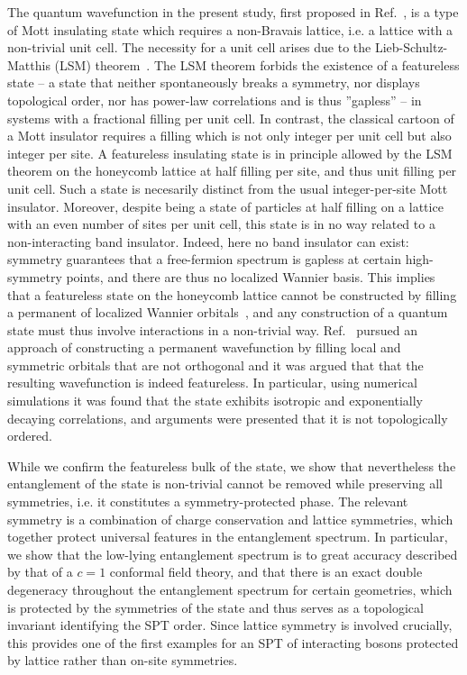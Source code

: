 The quantum wavefunction in the present study, first proposed in Ref.~,
is a type of Mott insulating state which requires a non-Bravais lattice, i.e. a lattice with a non-trivial unit cell. 
The necessity for a unit cell arises due to the Lieb-Schultz-Matthis (LSM) theorem~\cite{...}.
The LSM theorem forbids the existence of a featureless state
-- a state that neither spontaneously breaks a symmetry, nor displays topological
order, nor has power-law correlations and is thus ''gapless'' -- in systems
with a fractional filling per unit cell. In contrast, the classical cartoon of a Mott insulator requires a filling which is not only integer per unit cell but also integer per site. A featureless insulating state is in principle allowed by the LSM theorem on the honeycomb lattice
at half filling per site, and thus unit filling per unit cell. Such a state is necesarily distinct from the usual integer-per-site Mott insulator. 
Moreover, despite being a state of particles at half filling on a lattice with an even number of sites per unit cell, this state is in no way related to a non-interacting band insulator.  Indeed, here no band insulator can exist: symmetry guarantees that a free-fermion spectrum is gapless at certain high-symmetry points, and there are
thus no localized Wannier basis.
This implies that a featureless state on the honeycomb lattice cannot be constructed by filling a permanent of localized Wannier
orbitals~\cite{parameswaran2013}, and any construction of a quantum state must thus involve interactions in a non-trivial way. 
Ref.~ pursued
an approach of constructing a permanent wavefunction by filling local and symmetric
orbitals that are not orthogonal and
it was argued that that the resulting wavefunction is indeed featureless.
In particular, using numerical simulations it was found that the state exhibits
isotropic and exponentially decaying correlations, and arguments were presented that it is not
topologically ordered.

While we confirm the featureless bulk of the state, we show that nevertheless the entanglement of the state is non-trivial cannot be removed while preserving
all symmetries, i.e. it constitutes a symmetry-protected phase. The relevant symmetry is a combination of charge
conservation and lattice symmetries, which together protect universal features in the entanglement spectrum. In
particular, we show that the low-lying entanglement spectrum is to great accuracy described by that of a $c=1$
conformal field theory, and that there is an exact double 
degeneracy throughout the entanglement spectrum for certain geometries, which is protected
by the symmetries of the state and thus serves as a topological invariant identifying the SPT order.
Since lattice symmetry is involved crucially, this provides one of the first examples for an SPT of interacting bosons
protected by lattice rather than on-site symmetries.

